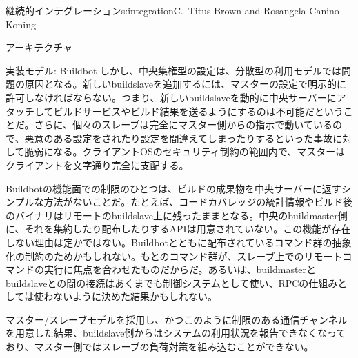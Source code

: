 \begin{aosachapter}{継続的インテグレーション}{s:integration}{C.\ Titus Brown and Rosangela Canino-Koning}
\begin{aosasect1}{アーキテクチャ}
\begin{aosasect2}{実装モデル: Buildbot}
しかし、中央集権型の設定は、分散型の利用モデルでは問題の原因となる。新しいbuildslaveを追加するには、マスターの設定で明示的に許可しなければならない。つまり、新しいbuildslaveを動的に中央サーバーにアタッチしてビルドサービスやビルド結果を送るようにするのは不可能だということだ。さらに、個々のスレーブは完全にマスター側からの指示で動いているので、悪意のある設定をされたり設定を間違えてしまったりするといった事故に対して脆弱になる。クライアントOSのセキュリティ制約の範囲内で、マスターはクライアントを文字通り完全に支配する。

Buildbotの機能面での制限のひとつは、ビルドの成果物を中央サーバーに返すシンプルな方法がないことだ。たとえば、コードカバレッジの統計情報やビルド後のバイナリはリモートのbuildslave上に残ったままとなる。中央のbuildmaster側に、それを集約したり配布したりするAPIは用意されていない。この機能が存在しない理由は定かではない。Buildbotとともに配布されているコマンド群の抽象化の制約のためかもしれない。もとのコマンド群が、スレーブ上でのリモートコマンドの実行に焦点を合わせたものだからだ。あるいは、buildmasterとbuildslaveとの間の接続はあくまでも制御システムとして使い、RPCの仕組みとしては使わないように決めた結果かもしれない。

マスター/スレーブモデルを採用し、かつこのように制限のある通信チャンネルを用意した結果、buildslave側からはシステムの利用状況を報告できなくなっており、マスター側ではスレーブの負荷対策を組み込むことができない。


\end{aosasect2}
\end{aosasect1}
\end{aosachapter}
